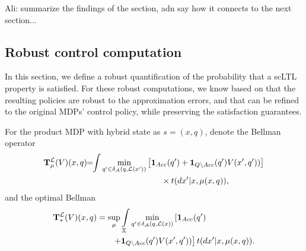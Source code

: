 \documentclass{ifacconf}
\newcommand{\red}[1]{{\color{red} #1}}
\renewcommand{\axx}[1]{{\color{orange} Ali: #1}}
\begin{document}
% 
% 
%

\axx{summarize the findings of the section, adn say how it connects to the next section...}

\subsection{Robust control computation}

In this section, we define a robust quantification of the probability that a scLTL property is satisfied.   
For these robust computations, we know based on
 \citet{tech_report_TACAS} that the resulting  policies are robust to the approximation errors,  and that can be refined to the original MDPs' control policy, while preserving the satisfaction guarantees.

\red{For the product MDP with hybrid state as $s=(x, q)$, denote the Bellman operator}
\begin{align}\label{eq:V_recopt_inf}
& \Bel_\pol^\Labset (V)(x,q) \!\!=\!\!\int%
\min_{q' \in \delta_\FSA(q, \Labset( x'))}\left[\mathbf 1_{Acc}(q')+  \mathbf 1_{Q\setminus Acc}(q')V( x',q'))\right]\notag\\&\hspace{5cm}\hfill \times{\tr}(d x'|x,\pol(x,q)),
\end{align}
and the optimal Bellman 
\begin{align}\label{eq:V_recopt_inf}
& \Bel_\ast^\Labset (V)(x,q) =\sup_\pol\int_{\X}\min_{ q' \in \delta_\FSA(q, \Labset(\bar x))}\left[\mathbf 1_{Acc}( q')\right.\hspace{1.5cm}\\&\left.\hspace{2.5cm}+  \mathbf 1_{Q\setminus Acc}( q')V( x', q'))\right]\notag {\tr}(d x'
|x,\pol(x,q)).
\end{align}
\end{document}
